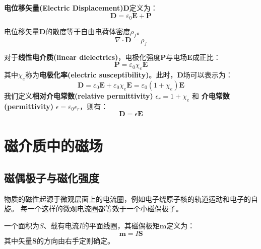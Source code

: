 \documentclass[fontset=none]{ctexart}
\begin{document}
\begin{definition}[电位移矢量]
    \textbf{电位移矢量(Electric Displacement)}$\bm{D}$定义为：
    \begin{equation}
        \bm{D} = \varepsilon_0 \bm{E} + \bm{P}
    \end{equation}
\end{definition}
\begin{law}[介质中的高斯定律]
    电位移矢量$\bm{D}$的散度等于自由电荷体密度$\rho_f$。
    \begin{equation}
        \nabla \cdot \bm{D} = \rho_f
    \end{equation}
\end{law}

对于\textbf{线性电介质(linear dielectrics)}，电极化强度$\bm{P}$与电场$\bm{E}$成正比：
\begin{equation}
    \bm{P} = \varepsilon_0 \chi_e \bm{E}
\end{equation}
其中$\chi_e$称为\textbf{电极化率(electric susceptibility)}。此时，$\bm{D}$场可以表示为：
\begin{equation}
    \bm{D} = \varepsilon_0 \bm{E} + \varepsilon_0 \chi_e \bm{E} = \varepsilon_0 (1 + \chi_e) \bm{E}
\end{equation}
我们定义\textbf{相对介电常数(relative permittivity)} $\epsilon_r = 1+\chi_e$ 
和 \textbf{介电常数(permittivity)} $\epsilon = \varepsilon_0 \epsilon_r$，则有：
\begin{equation}
    \bm{D} = \epsilon \bm{E}
\end{equation}

\section{磁介质中的磁场}

\subsection{磁偶极子与磁化强度}
物质的磁性起源于微观层面上的电流圈，例如电子绕原子核的轨道运动和电子的自旋。
每一个这样的微观电流圈都等效于一个小磁偶极子。

\begin{definition}[磁偶极矩]
    一个面积为$S$、载有电流$I$的平面线圈，其磁偶极矩$\bm{m}$定义为：
    \begin{equation}
        \bm{m} = I \bm{S}
    \end{equation}
    其中矢量$\bm{S}$的方向由右手定则确定。
\end{definition}
\end{document}
